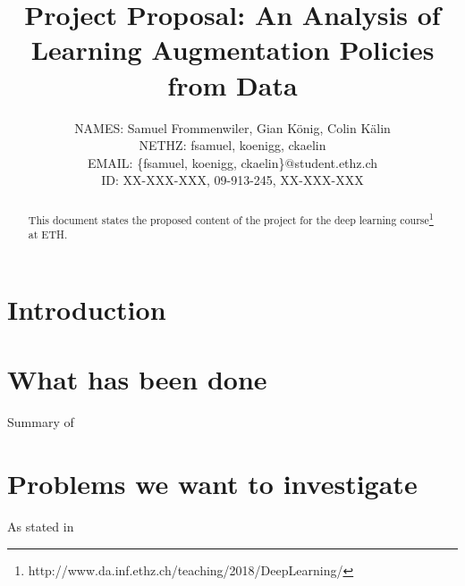 \documentclass[10pt,twocolumn,letterpaper]{article}
\begin{document}
\title{Project Proposal: An Analysis of Learning Augmentation Policies from Data}

\author{
    	\small{NAMES: Samuel Frommenwiler, Gian K\"onig, Colin K\"alin} \\
   	\small{NETHZ: fsamuel, koenigg, ckaelin}\\
	\small{EMAIL: \{fsamuel, koenigg, ckaelin\}$@$student.ethz.ch}\\
    	\small{ID: XX-XXX-XXX, 09-913-245, XX-XXX-XXX}
}

\maketitle

\begin{abstract}
   This document states the proposed content of the project for the deep learning course\footnote{http://www.da.inf.ethz.ch/teaching/2018/DeepLearning/} at ETH.
\end{abstract}

\section{Introduction}

\section{What has been done}

Summary of ~\cite{DBLP:journals/corr/abs-1805-09501}

\section{Problems we want to investigate}
As stated in~\cite{Goodfellow-et-al-2016} 

{\small


}
\end{document}
